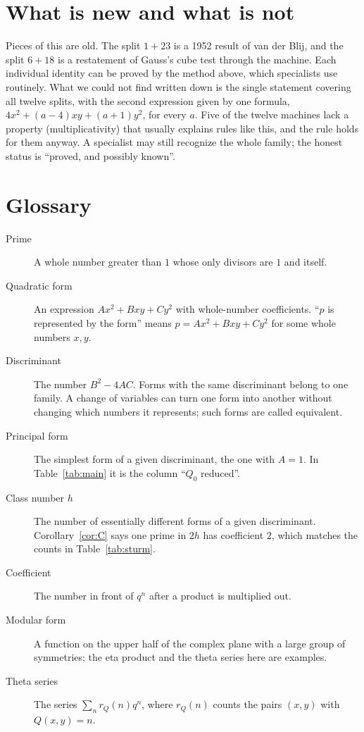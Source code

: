 \documentclass[11pt]{amsart}
\theoremstyle{definition}
\theoremstyle{remark}
\begin{document}
\section{What is new and what is not}

Pieces of this are old. The split $1+23$ is a 1952 result of van der Blij, and the split $6+18$ is a restatement of Gauss's cube test through the machine. Each individual identity can be proved by the method above, which specialists use routinely. What we could not find written down is the single statement covering all twelve splits, with the second expression given by one formula, $4x^2+(a-4)xy+(a+1)y^2$, for every $a$. Five of the twelve machines lack a property (multiplicativity) that usually explains rules like this, and the rule holds for them anyway. A specialist may still recognize the whole family; the honest status is ``proved, and possibly known''.

\section{Glossary}

\begin{description}
\item[Prime] A whole number greater than $1$ whose only divisors are $1$ and itself.
\item[Quadratic form] An expression $Ax^2+Bxy+Cy^2$ with whole-number coefficients. ``$p$ is represented by the form'' means $p=Ax^2+Bxy+Cy^2$ for some whole numbers $x,y$.
\item[Discriminant] The number $B^2-4AC$. Forms with the same discriminant belong to one family. A change of variables can turn one form into another without changing which numbers it represents; such forms are called equivalent.
\item[Principal form] The simplest form of a given discriminant, the one with $A=1$. In Table~\ref{tab:main} it is the column ``$Q_0$ reduced''.
\item[Class number $h$] The number of essentially different forms of a given discriminant. Corollary~\ref{cor:C} says one prime in $2h$ has coefficient $2$, which matches the counts in Table~\ref{tab:sturm}.
\item[Coefficient] The number in front of $q^n$ after a product is multiplied out.
\item[Modular form] A function on the upper half of the complex plane with a large group of symmetries; the eta product and the theta series here are examples.
\item[Theta series] The series $\sum_n r_Q(n)q^n$, where $r_Q(n)$ counts the pairs $(x,y)$ with $Q(x,y)=n$.
\end{description}
\end{document}
